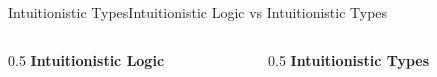 \documentclass[aspectratio=169,onlytextwidth]{beamer}
\begin{document}
\begin{frame}{Intuitionistic Types}{Intuitionistic Logic vs Intuitionistic Types}
  \begin{columns}
    \begin{column}{0.5\textwidth}
      \centering
      \textbf{Intuitionistic Logic}

      \vspace{3mm}
      \begin{prooftree}
      \end{prooftree}
    \end{column}

    \begin{column}{0.5\textwidth}
      \centering
      \textbf{Intuitionistic Types}

      \vspace{3mm}
      \begin{prooftree}
      \end{prooftree}
    \end{column}
  \end{columns}
\end{frame}
\end{document}
